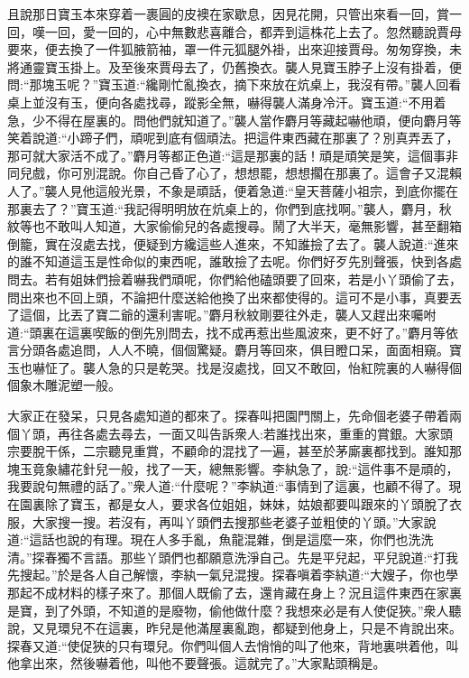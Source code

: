 \begin{parag}
    且說那日寶玉本來穿着一裹圓的皮襖在家歇息，因見花開，只管出來看一回，賞一回，嘆一回，愛一回的，心中無數悲喜離合，都弄到這株花上去了。忽然聽說賈母要來，便去換了一件狐腋箭袖，罩一件元狐腿外褂，出來迎接賈母。匆匆穿換，未將通靈寶玉掛上。及至後來賈母去了，仍舊換衣。襲人見寶玉脖子上沒有掛着，便問:“那塊玉呢？”寶玉道:“纔剛忙亂換衣，摘下來放在炕桌上，我沒有帶。”襲人回看桌上並沒有玉，便向各處找尋，蹤影全無，嚇得襲人滿身冷汗。寶玉道:“不用着急，少不得在屋裏的。問他們就知道了。”襲人當作麝月等藏起嚇他頑，便向麝月等笑着說道:“小蹄子們，頑呢到底有個頑法。把這件東西藏在那裏了？別真弄丟了，那可就大家活不成了。”麝月等都正色道:“這是那裏的話！頑是頑笑是笑，這個事非同兒戲，你可別混說。你自己昏了心了，想想罷，想想擱在那裏了。這會子又混賴人了。”襲人見他這般光景，不象是頑話，便着急道:“皇天菩薩小祖宗，到底你擺在那裏去了？”寶玉道:“我記得明明放在炕桌上的，你們到底找啊。”襲人，麝月，秋紋等也不敢叫人知道，大家偷偷兒的各處搜尋。鬧了大半天，毫無影響，甚至翻箱倒籠，實在沒處去找，便疑到方纔這些人進來，不知誰撿了去了。襲人說道:“進來的誰不知道這玉是性命似的東西呢，誰敢撿了去呢。你們好歹先別聲張，快到各處問去。若有姐妹們撿着嚇我們頑呢，你們給他磕頭要了回來，若是小丫頭偷了去，問出來也不回上頭，不論把什麼送給他換了出來都使得的。這可不是小事，真要丟了這個，比丟了寶二爺的還利害呢。”麝月秋紋剛要往外走，襲人又趕出來囑咐道:“頭裏在這裏喫飯的倒先別問去，找不成再惹出些風波來，更不好了。”麝月等依言分頭各處追問，人人不曉，個個驚疑。麝月等回來，俱目瞪口呆，面面相窺。寶玉也嚇怔了。襲人急的只是乾哭。找是沒處找，回又不敢回，怡紅院裏的人嚇得個個象木雕泥塑一般。
\end{parag}


\begin{parag}
    大家正在發呆，只見各處知道的都來了。探春叫把園門關上，先命個老婆子帶着兩個丫頭，再往各處去尋去，一面又叫告訴衆人:若誰找出來，重重的賞銀。大家頭宗要脫干係，二宗聽見重賞，不顧命的混找了一遍，甚至於茅廝裏都找到。誰知那塊玉竟象繡花針兒一般，找了一天，總無影響。李紈急了，說:“這件事不是頑的，我要說句無禮的話了。”衆人道:“什麼呢？”李紈道:“事情到了這裏，也顧不得了。現在園裏除了寶玉，都是女人，要求各位姐姐，妹妹，姑娘都要叫跟來的丫頭脫了衣服，大家搜一搜。若沒有，再叫丫頭們去搜那些老婆子並粗使的丫頭。”大家說道:“這話也說的有理。現在人多手亂，魚龍混雜，倒是這麼一來，你們也洗洗清。”探春獨不言語。那些丫頭們也都願意洗淨自己。先是平兒起，平兒說道:“打我先搜起。”於是各人自己解懷，李紈一氣兒混搜。探春嗔着李紈道:“大嫂子，你也學那起不成材料的樣子來了。那個人既偷了去，還肯藏在身上？況且這件東西在家裏是寶，到了外頭，不知道的是廢物，偷他做什麼？我想來必是有人使促狹。”衆人聽說，又見環兒不在這裏，昨兒是他滿屋裏亂跑，都疑到他身上，只是不肯說出來。探春又道:“使促狹的只有環兒。你們叫個人去悄悄的叫了他來，背地裏哄着他，叫他拿出來，然後嚇着他，叫他不要聲張。這就完了。”大家點頭稱是。
\end{parag}


